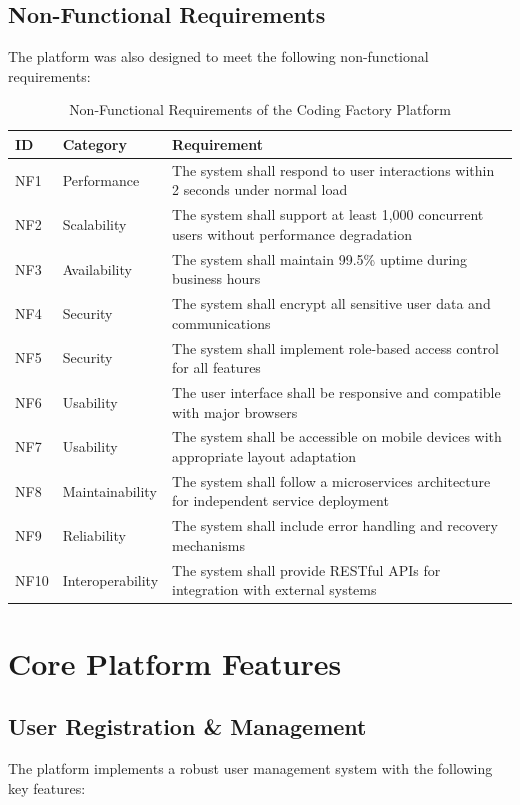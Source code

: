 \documentclass[12pt,a4paper]{report}
\begin{document}
\subsection{Non-Functional Requirements}

The platform was also designed to meet the following non-functional requirements:

\begin{table}[H]
\small
\centering
\begin{tabular}{|p{1cm}|p{2.8cm}|p{7.8cm}|}
\hline
\textbf{ID} & \textbf{Category} & \textbf{Requirement} \\
\hline
NF1 & Performance & The system shall respond to user interactions within 2 seconds under normal load \\
\hline
NF2 & Scalability & The system shall support at least 1,000 concurrent users without performance degradation \\
\hline
NF3 & Availability & The system shall maintain 99.5\% uptime during business hours \\
\hline
NF4 & Security & The system shall encrypt all sensitive user data and communications \\
\hline
NF5 & Security & The system shall implement role-based access control for all features \\
\hline
NF6 & Usability & The user interface shall be responsive and compatible with major browsers \\
\hline
NF7 & Usability & The system shall be accessible on mobile devices with appropriate layout adaptation \\
\hline
NF8 & Maintainability & The system shall follow a microservices architecture for independent service deployment \\
\hline
NF9 & Reliability & The system shall include error handling and recovery mechanisms \\
\hline
NF10 & Interoperability & The system shall provide RESTful APIs for integration with external systems \\
\hline
\end{tabular}
\caption{Non-Functional Requirements of the Coding Factory Platform}
\label{tab:non-functional-requirements}
\end{table}

\section{Core Platform Features}

\subsection{User Registration \& Management}
The platform implements a robust user management system with the following key features:
\end{document}
